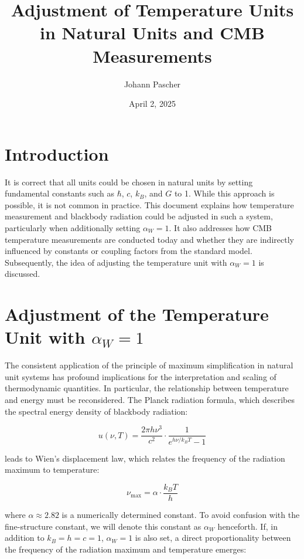 \documentclass[12pt,a4paper]{article}
\title{Adjustment of Temperature Units in Natural Units and CMB Measurements}
\author{Johann Pascher}
\date{April 2, 2025}
\begin{document}
	
	\maketitle
	
	\section*{Introduction}
	
	It is correct that all units could be chosen in natural units by setting fundamental constants such as $\hbar$, $c$, $k_B$, and $G$ to 1. While this approach is possible, it is not common in practice. This document explains how temperature measurement and blackbody radiation could be adjusted in such a system, particularly when additionally setting $\alpha_W = 1$. It also addresses how CMB temperature measurements are conducted today and whether they are indirectly influenced by constants or coupling factors from the standard model. Subsequently, the idea of adjusting the temperature unit with $\alpha_W = 1$ is discussed.
	
	\section{Adjustment of the Temperature Unit with $\alpha_W = 1$}
	
	The consistent application of the principle of maximum simplification in natural unit systems has profound implications for the interpretation and scaling of thermodynamic quantities. In particular, the relationship between temperature and energy must be reconsidered. The Planck radiation formula, which describes the spectral energy density of blackbody radiation:
	
	\begin{equation}
		u(\nu, T) = \frac{2\pi h \nu^3}{c^2} \cdot \frac{1}{e^{h \nu / k_B T} - 1}
	\end{equation}
	
	leads to Wien's displacement law, which relates the frequency of the radiation maximum to temperature:
	
	\begin{equation}
		\nu_{\text{max}} = \alpha \cdot \frac{k_B T}{h}
	\end{equation}
	
	where $\alpha \approx 2.82$ is a numerically determined constant. To avoid confusion with the fine-structure constant, we will denote this constant as $\alpha_W$ henceforth. If, in addition to $k_B = h = c = 1$, $\alpha_W = 1$ is also set, a direct proportionality between the frequency of the radiation maximum and temperature emerges:
	
\end{document}
